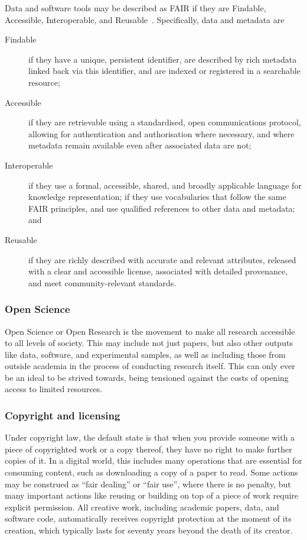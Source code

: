 \documentclass{article}
\begin{document}
Data and software tools may be described as FAIR if they are
Findable, Accessible, Interoperable, and Reusable~\cite{wilkinson2016fair}.
Specifically,
data and metadata are
\begin{description}
  \item[Findable]
        if they have a unique, persistent identifier,
        are described by rich metadata linked back via this identifier,
        and are indexed or registered in a searchable resource;
  \item[Accessible]
        if they are retrievable using a standardised, open communications protocol,
        allowing for authentication and authorisation where necessary,
        and where metadata remain available even after associated data are not;
  \item[Interoperable]
        if they use a formal, accessible, shared, and broadly applicable language for knowledge representation;
        if they use vocabularies that follow the same FAIR principles,
        and use qualified references to other data and metadata;
        and
  \item[Reusable]
        if they are richly described with accurate and relevant attributes,
        released with a clear and accessible license,
        associated with detailed provenance,
        and meet community-relevant standards.
\end{description}

\subsubsection{Open Science}

Open Science or Open Research is
the movement to make all research accessible to all levels of society.
This may include not just papers,
but also other outputs like data, software, and experimental samples,
as well as including those from outside academia in
the process of conducting research itself.
This can only ever be an ideal to be strived towards,
being tensioned against the costs of opening access to limited resources.

\subsubsection{Copyright and licensing}

Under copyright law,
the default state is that
when you provide someone with a piece of copyrighted work
or a copy thereof,
they have no right to make further copies of it.
In a digital world,
this includes many operations that are essential for consuming content,
such as downloading a copy of a paper to read.
Some actions may be construed as ``fair dealing'' or ``fair use'',
where there is no penalty,
but many important actions
like reusing or building on top of a piece of work
require explicit permission.
All creative work,
including academic papers, data, and software code,
automatically receives copyright protection at the moment of its creation,
which typically lasts for seventy years beyond the death of its creator.
\end{document}
